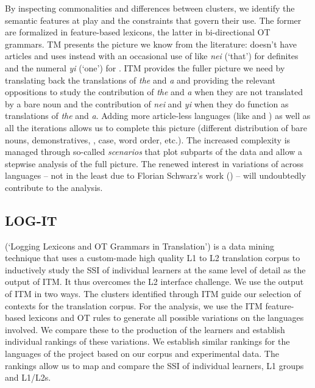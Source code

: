 \documentclass[output=paper,
modfonts
]{langscibook}
\begin{document}
By inspecting commonalities and differences between clusters, we identify the semantic features at play and the constraints that govern their use. The former are formalized in feature-based lexicons, the latter in bi-directional OT grammars. TM presents the picture we know from the literature:  doesn’t have articles and uses  instead with an occasional use of  like \textit{nei} (‘that’) for definites and the numeral \textit{yi} (‘one’) for . ITM provides the fuller picture we need by translating back the translations of \textit{the} and \textit{a} and providing the relevant oppositions to study the contribution of \textit{the} and \textit{a} when they are not translated by a bare noun and the contribution of \textit{nei} and \textit{yi} when they do function as translations of \textit{the} and \textit{a}. Adding more article-less languages (like  and ) as well as all the iterations allows us to complete this picture (different distribution of bare nouns, demonstratives, , case, word order, etc.). The increased complexity is managed through so-called \textit{scenarios} that plot subparts of the data and allow a stepwise analysis of the full picture. The renewed interest in variations of  across languages -- not in the least due to Florian Schwarz’s work (\citealt{Schwarz2009,SchwarzToappear}) -- will undoubtedly contribute to the analysis.

\subsection{LOG-IT}

 (‘Logging Lexicons and OT Grammars in Translation’) is a data mining technique that uses a custom-made high quality L1 to L2 translation corpus to inductively study the SSI of individual learners at the same level of detail as the output of ITM. It thus overcomes the L2 interface challenge. 
We use the output of ITM in two ways. The clusters identified through ITM guide our selection of contexts for the translation corpus. For the analysis, we use the ITM feature-based lexicons and OT rules to generate all possible variations on the languages involved. We compare these to the production of the learners and establish individual rankings of these variations. We establish similar rankings for the languages of the project based on our corpus and experimental data. 
The rankings allow us to map and compare the SSI of individual learners, L1 groups and L1/L2s. 
\end{document}
